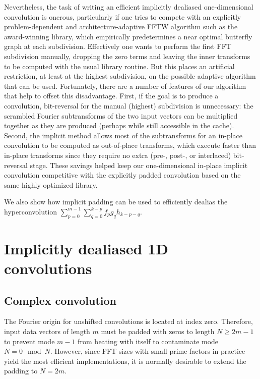 \documentclass[final]{siamltex}
\begin{document}
Nevertheless, the task of writing an efficient implicitly dealiased
one-dimensional convolution is onerous, particularly if one tries to
compete with an explicitly problem-dependent and architecture-adaptive
FFTW algorithm such as the award-winning \cite{FFTW} library, which
empirically predetermines a near optimal butterfly graph
at each subdivision. Effectively one wants to perform
the first FFT subdivision manually, dropping the zero terms and
leaving the inner transforms to be computed with the usual library
routine. But this places an artificial restriction, at least at the
highest subdivision, on the possible adaptive algorithm that can be
used. Fortunately, there are a number of features of our algorithm
that help to offset this disadvantage. First, if the goal is to
produce a convolution, bit-reversal for the manual (highest)
subdivision is unnecessary: the scrambled Fourier subtransforms of the
two input vectors can be multiplied together as they are produced
(perhaps while still accessible in the cache). Second, the implicit
method allows most of the subtransforms for an in-place convolution to
be computed as out-of-place transforms, which execute faster than
in-place transforms since they require no extra (pre-, post-, or
interlaced) bit-reversal stage.  These savings helped keep our
one-dimensional in-place implicit convolution competitive with the
explicitly padded convolution based on the same highly optimized
library.

We also show how implicit padding can be used to efficiently
dealias the hyperconvolution 
$\sum_{p=0}^{m-1}\sum_{q=0}^{k-p} f_p g_q h_{k-p-q}$. 

\section{Implicitly dealiased 1D convolutions}
\subsection{Complex convolution}
The Fourier origin for unshifted convolutions is located at index zero.
Therefore, input data vectors of length $m$ must be padded with zeros to
length $N\ge 2m-1$ to prevent mode $m-1$ from beating with itself to
contaminate mode~$N=0\mod N$. However, since FFT sizes with small prime
factors in practice yield the most efficient implementations, it is normally
desirable to extend the padding to $N=2m$.
\end{document}

